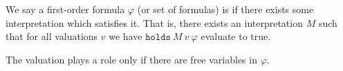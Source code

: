 \begin{definition}\label{fol-000F}%
We say a first-order formula $\varphi$ (or set of formulas) is
 if there exists some interpretation which satisfies it.
That is, there exists an interpretation $M$ such that for all valuations
$v$ we have $\mathtt{holds}~M~v~\varphi$ evaluate to true.

The valuation plays a role only if there are free variables in $\varphi$.
\end{definition}